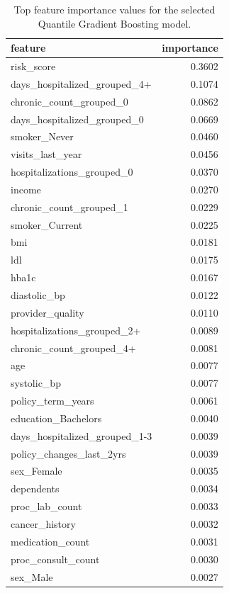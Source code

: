 \begin{table}
\caption{Top feature importance values for the selected Quantile Gradient Boosting model.}
\label{tab:06-selected-tail-feature-importance}
\begin{tabular}{lr}
\toprule
feature & importance \\
\midrule
risk_score & 0.3602 \\
days_hospitalized_grouped_4+ & 0.1074 \\
chronic_count_grouped_0 & 0.0862 \\
days_hospitalized_grouped_0 & 0.0669 \\
smoker_Never & 0.0460 \\
visits_last_year & 0.0456 \\
hospitalizations_grouped_0 & 0.0370 \\
income & 0.0270 \\
chronic_count_grouped_1 & 0.0229 \\
smoker_Current & 0.0225 \\
bmi & 0.0181 \\
ldl & 0.0175 \\
hba1c & 0.0167 \\
diastolic_bp & 0.0122 \\
provider_quality & 0.0110 \\
hospitalizations_grouped_2+ & 0.0089 \\
chronic_count_grouped_4+ & 0.0081 \\
age & 0.0077 \\
systolic_bp & 0.0077 \\
policy_term_years & 0.0061 \\
education_Bachelors & 0.0040 \\
days_hospitalized_grouped_1-3 & 0.0039 \\
policy_changes_last_2yrs & 0.0039 \\
sex_Female & 0.0035 \\
dependents & 0.0034 \\
proc_lab_count & 0.0033 \\
cancer_history & 0.0032 \\
medication_count & 0.0031 \\
proc_consult_count & 0.0030 \\
sex_Male & 0.0027 \\
\bottomrule
\end{tabular}
\end{table}
